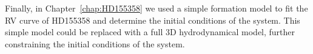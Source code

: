 Finally, in Chapter~\ref{chap:HD155358} we used a simple formation model to fit the RV curve of HD155358 and determine the initial conditions of the system. 
This simple model could be replaced with a full 3D hydrodynamical model, further constraining the initial conditions of the system. 


